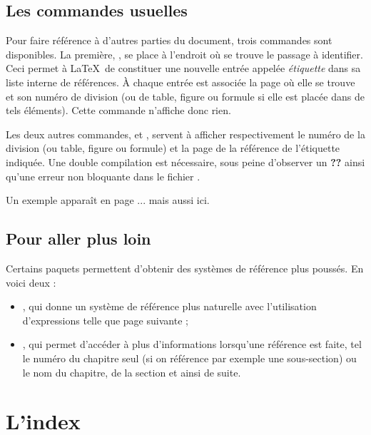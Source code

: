 \subsection{Les commandes usuelles}

Pour faire référence à d'autres parties du document, trois commandes sont disponibles. La première, , se place à l'endroit où se trouve le passage à identifier. Ceci permet à \LaTeX\ de constituer une nouvelle entrée appelée \emph{étiquette} dans sa liste interne de références. À chaque entrée est associée la page où elle se trouve et son numéro de division (ou de table, figure ou formule si elle est placée dans de tels éléments). Cette commande n'affiche donc rien.

Les deux autres commandes,  et , servent à afficher respectivement le numéro de la division (ou table, figure ou formule) et la page de la référence de l'étiquette indiquée. Une double compilation est nécessaire, sous peine d'observer un \textbf{\string?\string?} ainsi qu'une erreur non bloquante dans le fichier .

Un exemple apparaît en page \pageref{monexemple}... mais aussi ici. 

\subsection{Pour aller plus loin}

Certains paquets permettent d'obtenir des systèmes de référence plus poussés. En voici deux :
\begin{itemize}
\item {}, qui donne un système de référence plus naturelle avec l'utilisation d'expressions telle que \og page suivante \fg ;
\item {}, qui permet d'accéder à plus d'informations lorsqu'une référence est faite, tel le numéro du chapitre seul (si on référence par exemple une sous-section) ou le nom du chapitre, de la section et ainsi de suite.
\end{itemize}

\section{L'index}  \label{secindex} 

